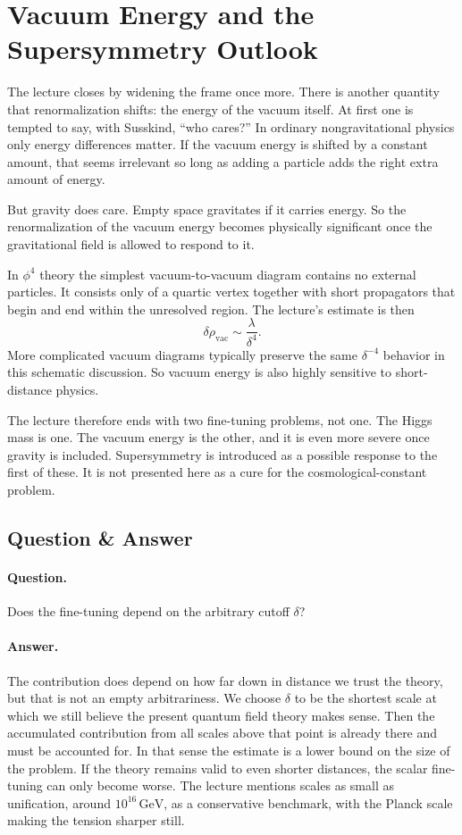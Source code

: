 \section{Vacuum Energy and the Supersymmetry Outlook}

The lecture closes by widening the frame once more. There is another quantity that renormalization shifts: the energy of the vacuum itself. At first one is tempted to say, with Susskind, ``who cares?'' In ordinary nongravitational physics only energy differences matter. If the vacuum energy is shifted by a constant amount, that seems irrelevant so long as adding a particle adds the right extra amount of energy.

But gravity does care. Empty space gravitates if it carries energy. So the renormalization of the vacuum energy becomes physically significant once the gravitational field is allowed to respond to it.

In \(\phi^4\) theory the simplest vacuum-to-vacuum diagram contains no external particles. It consists only of a quartic vertex together with short propagators that begin and end within the unresolved region. The lecture's estimate is then
\begin{equation}
\delta\rho_{\mathrm{vac}}\sim \frac{\lambda}{\delta^4}.
\end{equation}
More complicated vacuum diagrams typically preserve the same \(\delta^{-4}\) behavior in this schematic discussion. So vacuum energy is also highly sensitive to short-distance physics.

The lecture therefore ends with two fine-tuning problems, not one. The Higgs mass is one. The vacuum energy is the other, and it is even more severe once gravity is included. Supersymmetry is introduced as a possible response to the first of these. It is not presented here as a cure for the cosmological-constant problem.

\subsection{Question \& Answer}

\paragraph{Question.} Does the fine-tuning depend on the arbitrary cutoff \(\delta\)?

\paragraph{Answer.} The contribution does depend on how far down in distance we trust the theory, but that is not an empty arbitrariness. We choose \(\delta\) to be the shortest scale at which we still believe the present quantum field theory makes sense. Then the accumulated contribution from all scales above that point is already there and must be accounted for. In that sense the estimate is a lower bound on the size of the problem. If the theory remains valid to even shorter distances, the scalar fine-tuning can only become worse. The lecture mentions scales as small as unification, around \(10^{16}\,\mathrm{GeV}\), as a conservative benchmark, with the Planck scale making the tension sharper still.

